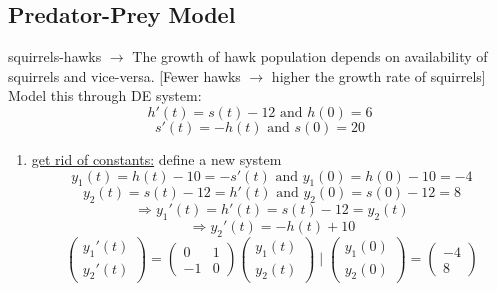 \documentclass{article}
\begin{document}
\subsection*{Predator-Prey Model}
squirrels-hawks $\rightarrow$ The growth of hawk population depends on availability of squirrels and vice-versa. [Fewer hawks $\rightarrow$ higher the growth rate of squirrels]
\\ Model this through DE system:
\begin{equation*} h'(t) = s(t) - 12 \text{ and } h(0) = 6\end{equation*}
\begin{equation*} s'(t) = -h(t) \text{  and  } s(0) = 20 \end{equation*}
\begin{enumerate} 
    \item \underline{get rid of constants:} define a new system \\
    \begin{equation*} y_1(t) = h(t) - 10 = -s'(t) \text{    and    } y_1(0) = h(0) - 10 = -4\end{equation*}
    \begin{equation*} y_2(t) = s(t) - 12 = h'(t) \text{   and   }  y_2(0) = s(0) - 12 = 8 \end{equation*}
    \begin{equation*} \Rightarrow y_1'(t) = h'(t) = s(t) - 12 = y_2(t)  \end{equation*}
    \begin{equation*} \Rightarrow y_2'(t) = -h(t) + 10 \end{equation*} 
    \begin{equation*} \begin{pmatrix} y_1'(t) \\ y_2'(t) \end{pmatrix} = \begin{pmatrix} 0 & 1 \\ -1 & 0 \end{pmatrix} \begin{pmatrix} y_1(t) \\ y_2(t) \end{pmatrix} \mid \begin{pmatrix} y_1(0) \\ y_2(0) \end{pmatrix} = \begin{pmatrix} -4 \\ 8 \end{pmatrix} \end{equation*} 

\end{enumerate}
\end{document}
